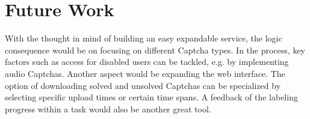 \section{Future Work}
\label{sec:future_work}

With the thought in mind of building an easy expandable service, the logic consequence would be on focusing on different Captcha types. In the process, key factors such as access for disabled users can be tackled, e.g. by implementing audio Captchas.
Another aspect would be expanding the web interface. The option of downloading solved and unsolved Captchas can be specialized by selecting specific upload times or certain time spans. A feedback of the labeling progress within a task would also be another great tool.



\clearpage